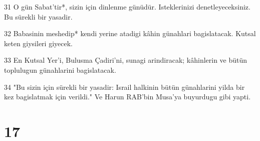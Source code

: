 \par 31 O gün Sabat'tir*, sizin için dinlenme günüdür. Isteklerinizi denetleyeceksiniz. Bu sürekli bir yasadir.
\par 32 Babasinin meshedip* kendi yerine atadigi kâhin günahlari bagislatacak. Kutsal keten giysileri giyecek.
\par 33 En Kutsal Yer'i, Bulusma Çadiri'ni, sunagi arindiracak; kâhinlerin ve bütün toplulugun günahlarini bagislatacak.
\par 34 "Bu sizin için sürekli bir yasadir: Israil halkinin bütün günahlarini yilda bir kez bagislatmak için verildi." Ve Harun RAB'bin Musa'ya buyurdugu gibi yapti.

\chapter{17}

